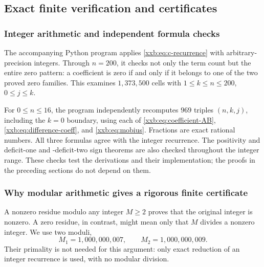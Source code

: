 \documentclass[11pt,a4paper]{article}
\numberwithin{equation}{section}
\theoremstyle{definition}
\theoremstyle{remark}
\theoremstyle{plain}
\begin{document}
\subsection{Exact finite verification and certificates}\label{xxb:sec:computation}
\subsubsection{Integer arithmetic and independent formula checks}
The accompanying Python program applies \eqref{xxb:eq:c-recurrence} with
arbitrary-precision integers. Through $n=200$, it checks not only the
term count but the entire zero pattern: a coefficient is zero if and only
if it belongs to one of the two proved zero families. This examines
$1{,}373{,}500$ cells with $1\le k\le n\le200$, $0\le j\le k$.

For $0\le n\le16$, the program independently recomputes $969$ triples
$(n,k,j)$, including the $k=0$ boundary, using each of
\eqref{xxb:eq:coefficient-AB}, \eqref{xxb:eq:difference-coeff}, and
\eqref{xxb:eq:mobius}. Fractions are exact rational numbers. All three formulas
agree with the integer recurrence. The positivity and deficit-one and
-deficit-two sign theorems are also checked throughout the integer range.
These checks test the derivations and their implementation; the proofs in
the preceding sections do not depend on them.

\subsubsection{Why modular arithmetic gives a rigorous finite certificate}
A nonzero residue modulo any integer $M\ge2$ proves that the original
integer is nonzero. A zero residue, in contrast, might mean only that
$M$ divides a nonzero integer. We use two moduli,
\begin{equation}\label{xxb:eq:moduli}
 M_1=1{,}000{,}000{,}007,\qquad M_2=1{,}000{,}000{,}009.
\end{equation}
Their primality is not needed for this argument: only exact reduction of
an integer recurrence is used, with no modular division.
\end{document}
